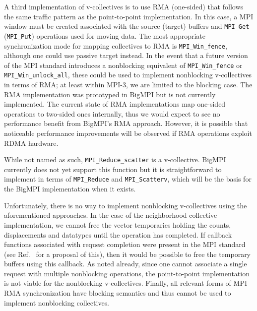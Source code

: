 A third implementation of v-collectives is to use RMA (one-sided) that follows
the same traffic pattern as the point-to-point implementation.
In this case, a MPI window must be created associated with the source (target)
buffers and \texttt{MPI\_Get} (\texttt{MPI\_Put}) operations used for moving data.
The most appropriate synchronization mode for mapping collectives to RMA
is \texttt{MPI\_Win\_fence}, although one could use passive target instead.
In the event that a future version of the MPI standard introduces a nonblocking
equivalent of \texttt{MPI\_Win\_fence} or \texttt{MPI\_Win\_unlock\_all}, these
could be used to implement nonblocking v-collectives in terms of RMA; 
at least within MPI-3, we are limited to the blocking case.
The RMA implementation was prototyped in BigMPI but is not currently implemented.
The current state of RMA implementations map one-sided operations to two-sided ones internally, thus we would expect to see no performance benefit from BigMPI's RMA approach.
However, it is possible that noticeable performance improvements will be
observed if RMA operations exploit RDMA hardware.

While not named as such, \texttt{MPI\_Reduce\_scatter} is a v-collective.
BigMPI currently does not yet support this function
but it is straightforward to implement in terms of  \texttt{MPI\_Reduce} and
\texttt{MPI\_Scatterv}, which will be the basis for the BigMPI implementation
when it exists.



Unfortunately, there is no way to implement nonblocking v-collectives using 
the aforementioned approaches.  In the case of the neighborhood collective
implementation, we cannot free the vector temporaries holding the counts,
displacements and datatypes until the operation has completed.
If callback functions associated with request completion were present in the
MPI standard (see Ref.~\cite{ticket26} for a proposal of this), then it would
be possible to free the temporary buffers using this callback.
As noted already, since one cannot associate a single request with multiple
nonblocking operations, the point-to-point implementation is not viable
for the nonblocking v-collectives.
Finally, all relevant forms of MPI RMA synchronization have blocking semantics
and thus cannot be used to implement nonblocking collectives.

